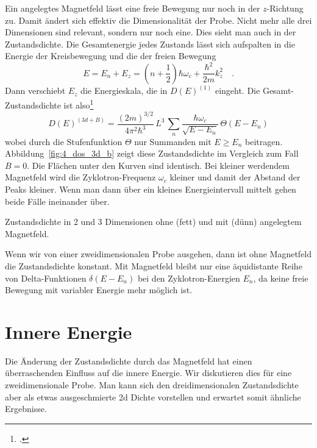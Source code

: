 Ein angelegtes Magnetfeld lässt eine freie Bewegung nur noch in der $z$-Richtung zu. Damit ändert sich effektiv die Dimensionalität der Probe. Nicht mehr alle drei Dimensionen sind relevant, sondern nur noch eine. Dies sieht man auch in der Zustandsdichte. Die Gesamtenergie jedes Zustands lässt sich aufspalten in die  Energie der Kreisbewegung und die der freien Bewegung
\begin{equation}
   E = E_n + E_z =  \left(n + \frac{1}{2} \right) \hbar \omega_c +  \frac{\hbar^2}{2m} k_z^2 \quad .
\end{equation}
Dann verschiebt $E_z$ die Energieskala, die in $ D(E)^{(1)}$ eingeht. Die Gesamt-Zustandsdichte ist also\footcite{Czycholl_theo_FK1}
\begin{equation}
   D(E)^{(3d + B)} = 
    \frac{(2m)^{3/2}}{4 \pi^2 \hbar^3}
    \, L^3  \, \sum_n \frac{\hbar \omega_c}{ \sqrt{E - E_n}} \, \Theta(E-E_n)
\end{equation} 
wobei durch die Stufenfunktion $\Theta$ nur Summanden mit $E \ge E_n$ beitragen. Abbildung~\ref{fig:4_dos_3d_b} zeigt diese Zustandsdichte im Vergleich zum Fall $B=0$. Die Flächen unter den Kurven sind identisch. Bei kleiner werdendem Magnetfeld wird die Zyklotron-Frequenz $\omega_c$ kleiner und damit der Abstand der Peaks kleiner. Wenn man dann über ein kleines Energieintervall mittelt gehen beide Fälle ineinander über.

\begin{marginfigure}
   \caption{Zustandsdichte in 2 und 3 Dimensionen ohne (fett) und mit (dünn) angelegtem Magnetfeld. \label{fig:4_dos_3d_b}}
\end{marginfigure}


Wenn wir von einer zweidimensionalen Probe ausgehen, dann ist ohne Magnetfeld die Zustandsdichte konstant. Mit Magnetfeld bleibt nur eine äquidistante Reihe von Delta-Funktionen $\delta(E-E_n)$ bei den Zyklotron-Energien $E_n$, da keine freie Bewegung mit variabler Energie mehr möglich ist. 


\section{Innere Energie} 

Die Änderung der Zustandsdichte durch das Magnetfeld hat einen überraschenden Einfluss auf die innere Energie. Wir diskutieren dies  für eine zweidimensionale Probe. Man kann sich den dreidimensionalen Zustandsdichte aber als etwas ausgeschmierte 2d Dichte vorstellen und erwartet somit ähnliche Ergebnisse.

